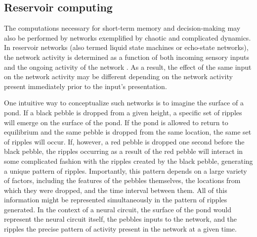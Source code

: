 \subsection{Reservoir computing} \label{intro:reservoir}

The computations necessary for short-term memory and decision-making may also be performed by networks exemplified by chaotic and complicated dynamics. In reservoir networks (also termed liquid state machines or echo-state networks), the network activity is determined as a function of both incoming sensory inputs and the ongoing activity of the network \citep{Jaeger:2004hj, Maass:2002kf, Buonomano:2009cw, Buonomano:1995fm, Verstraeten:2007jw}. As a result, the effect of the same input on the network activity may be different depending on the network activity present immediately prior to the input’s presentation.

\bigskip
One intuitive way to conceptualize such networks is to imagine the surface of a pond. If a black pebble is dropped from a given height, a specific set of ripples will emerge on the surface of the pond. If the pond is allowed to return to equilibrium and the same pebble is dropped from the same location, the same set of ripples will occur. If, however, a red pebble is dropped one second before the black pebble, the ripples occurring as a result of the red pebble will interact in some complicated fashion with the ripples created by the black pebble, generating a unique pattern of ripples. Importantly, this pattern depends on a large variety of factors, including the features of the pebbles themselves, the locations from which they were dropped, and the time interval between them. All of this information might be represented simultaneously in the pattern of ripples generated. In the context of a neural circuit, the surface of the pond would represent the neural circuit itself, the pebbles inputs to the network, and the ripples the precise pattern of activity present in the network at a given time. 

